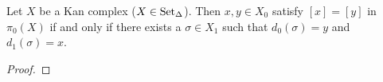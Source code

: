 \begin{prop}
    Let $X$ be a Kan complex ($X \in \operatorname{Set}_{\Delta}$).
    Then $x,y \in X_0$ satisfy $[x]=[y]$ in $\pi_0(X)$ if and only if there exists a $\sigma \in X_1$ such that $d_0(\sigma)=y$ and $d_1(\sigma)=x$.
\end{prop}

\begin{proof}
    
    
\end{proof}

